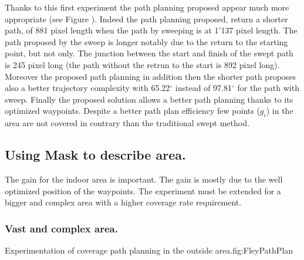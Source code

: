 Thanks to this first experiment the path planning proposed appear much more appropriate (see Figure ). Indeed the path planning proposed, return a shorter path, of 881 pixel length when  the path by sweeping is at 1'137 pixel length. The path proposed by the sweep is longer notably due to the return to the starting point, but not only. The junction between the start and finish of the swept path is 245 pixel long (the path without the retrun to the start is 892  pixel long).%
 Moreover the proposed path planning in addition then the shorter path proposes also a better trajectory complexity  with 65.22$^\circ$ instead of 97.81$^\circ$ for the path with sweep.
Finally the proposed solution allows a better path planning thanks to its optimized waypoints. Despite a better path plan efficiency few points ($g_i$) in the area are not covered in contrary than the traditional swept method.



\subsection{Using Mask to describe area.}\label{coverageOutDoor}

The gain for the indoor area is important. The gain is mostly due to the well optimized position of the waypoints. The experiment must be extended for a bigger and complex area with a higher coverage rate requirement.


\subsubsection{Vast and complex area.} \label{fey_map_CPPP}
 
 \begin{mfigures}[!]{Experimentation of coverage path planning in the outside area.}{fig:FleyPathPlan} \centering
\hspace{1cm}

\tabsimuposeFleyPath
\end{mfigures} 
 
